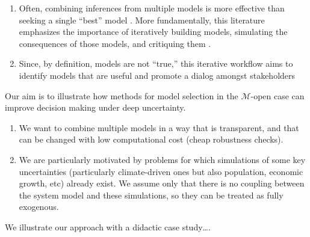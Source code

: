 \documentclass[12pt]{article}
\begin{document}
\begin{enumerate}
    \item Often, combining inferences from multiple models is more effective than seeking a single ``best'' model \citep{Yao:2018bu}. More fundamentally, this literature emphasizes the importance of iteratively building models, simulating the consequences of those models, and critiquing them \citep{gelman_workflow:2020}.
    \item Since, by definition, models are not ``true,'' this iterative workflow \citep{gelman_workflow:2020} aims to identify models that are useful and promote a dialog amongst stakeholders \citep{gelman_philosophy:2013}
\end{enumerate}
Our aim is to illustrate how methods for model selection in the $\mathcal{M}$-open case can improve decision making under deep uncertainty.
\begin{enumerate}
    \item We want to combine multiple models in a way that is transparent, and that can be changed with low computational cost (cheap robustness checks).
    \item We are particularly motivated by problems for which simulations of some key uncertainties (particularly climate-driven ones but also population, economic growth, etc) already exist. We assume only that there is no coupling between the system model and these simulations, so they can be treated as fully exogenous.
\end{enumerate}
We illustrate our approach with a didactic case study\ldots.
\end{document}
